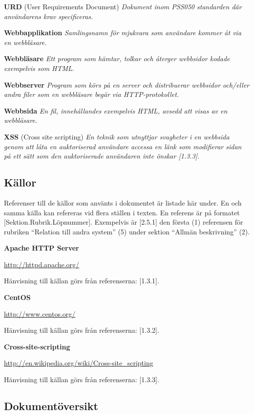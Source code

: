 \documentclass[a4paper, twoside, 11pt, titlepage]{article}
\begin{document}
	\textbf{URD} (User Requirements Document) \emph{Dokument inom PSS050 standarden där användarens krav specificeras.}

	\textbf{Webbapplikation} \emph{Samlingsnamn för mjukvara som användare kommer åt via en webbläsare.}

	\textbf{Webbläsare} \emph{Ett program som hämtar, tolkar och återger webbsidor kodade exempelvis som HTML.}

	\textbf{Webbserver} \emph{Program som körs på en server och distribuerar webbsidor och/eller andra filer som en webbläsare begär via HTTP-protokollet.}

	\textbf{Webbsida} \emph{En fil, innehållandes exempelvis HTML, avsedd att visas av en webbläsare.}

	\textbf{XSS} (Cross site scripting) \emph{En teknik som utnyttjar svagheter i en webbsida genom att låta en auktoriserad användare accessa en länk som modifierar sidan på ett sätt som den auktoriserade användaren inte önskar [1.3.3].}

	\subsection{Källor}


	Referenser till de källor som använts i dokumentet är listade här under. En och samma källa kan refereras vid flera ställen i texten. En referens är på formatet [Sektion.Rubrik.Löpnummer]. Exempelvis är [2.5.1] den första (1) referensen för rubriken ``Relation till andra system'' (5) under sektion ``Allmän beskrivning'' (2).

	\textbf{Apache HTTP Server}

	\url{http://httpd.apache.org/}

	Hänvisning till källan görs från referenserna: [1.3.1].

	\textbf{CentOS}

	\url{http://www.centos.org/}

	Hänvisning till källan görs från referenserna: [1.3.2].

	\textbf{Cross-site-scripting}

	\url{http://en.wikipedia.org/wiki/Cross-site_scripting}

	Hänvisning till källan görs från referenserna: [1.3.3].

	\subsection{Dokumentöversikt}
\end{document}
